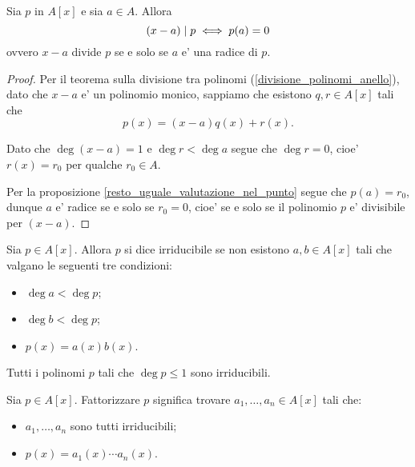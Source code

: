 \begin{theorem}
    [di Ruffini] \label{th_Ruffini}
    Sia $p$ in $A[x]$ e sia $a \in A$. Allora \[
        (x - a) \mid p \iff p(a) = 0    
    \] ovvero $x - a$ divide $p$ se e solo se $a$ e' una radice di $p$.
\end{theorem}
\begin{proof}
    Per il teorema sulla divisione tra polinomi (\ref{divisione_polinomi_anello}), dato che $x-a$ e' un polinomio monico, sappiamo che esistono $q, r \in A[x]$ tali che \[
        p(x) = (x-a)q(x) + r(x).
    \]

    Dato che $\deg (x - a) = 1$ e $\deg r < \deg a$ segue che $\deg r = 0$, cioe' $r(x) = r_0$ per qualche $r_0 \in A$.

    Per la proposizione \ref{resto_uguale_valutazione_nel_punto} segue che $p(a) = r_0$, dunque $a$ e' radice se e solo se $r_0 = 0$, cioe' se e solo se il polinomio $p$ e' divisibile per $(x - a)$.
\end{proof}

\begin{definition}[Irriducibile]
    Sia $p \in A[x]$. Allora $p$ si dice irriducibile se non esistono $a, b \in A[x]$ tali che valgano le seguenti tre condizioni: \begin{itemize}
        \item $\deg a < \deg p$;
        \item $\deg b < \deg p$;
        \item $p(x) = a(x)b(x)$.
    \end{itemize}
\end{definition}

\begin{remark}
    Tutti i polinomi $p$ tali che $\deg p \leq 1$ sono irriducibili.
\end{remark}

\begin{definition}
    Sia $p \in A[x]$. Fattorizzare $p$ significa trovare $a_1, \dots, a_n \in A[x]$ tali che: \begin{itemize}
        \item $a_1, \dots, a_n$ sono tutti irriducibili;
        \item $p(x) = a_1(x) \cdots a_n(x)$.
    \end{itemize}
\end{definition}